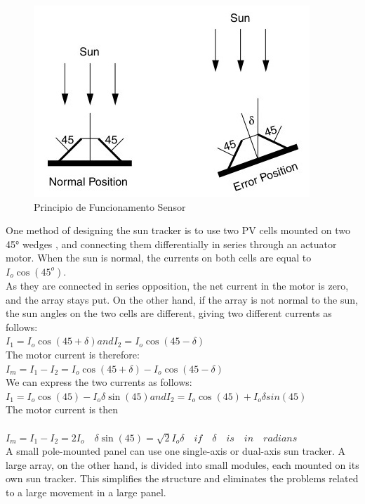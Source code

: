 \newpage

\begin{figure}[H]
\centering
\includegraphics[scale=0.52]{./image/Sensor_Actuator_Principle.jpg}
\caption{Principio de Funcionamento Sensor \cite{book_2}}
\end{figure}

One method of designing the sun tracker is to use two PV cells mounted on two 45° wedges , and connecting them differentially in series through an actuator motor. When the sun is normal, the currents on both cells are equal to $I_o \cos (45^o)$. \\

As they are connected in series opposition, the net current in the motor is zero, and the array stays put. On the other hand, if the array is not normal to the sun, the sun angles on the two cells are different, giving two different currents as follows: \\
$I_1 = I_o \cos(45 + \delta) and I_2 = I_o \cos(45 - \delta)$ \\
The motor current is therefore: \\
$I_m = I_1 - I_2 = I_o \cos(45 + \delta) - I_o \cos(45 - \delta)$ \\
We can express the two currents as follows: \\
$I_1 = I_o \cos (45) - I_o \delta \sin (45) and I_2 = I_o \cos (45) + I_o \delta sin (45)$ \\
The motor current is then\\
\\
$I_m = I_1 - I_2 = 2 I_o \quad \delta \sin (45) = \sqrt{2} I_o \delta \quad if \quad \delta \quad is \quad in \quad radians$ \\
A small pole-mounted panel can use one single-axis or dual-axis sun tracker. A large array, on the other hand, is divided into small modules, each mounted on its own sun tracker. This simplifies the structure and eliminates the problems related to a large movement in a large panel.



